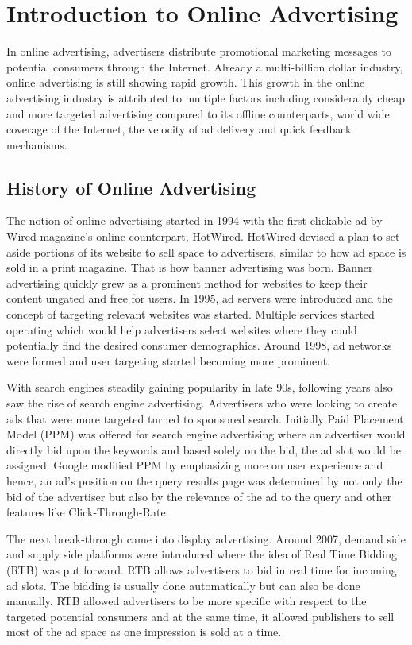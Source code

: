 \section{Introduction to Online Advertising}

In online advertising, advertisers distribute promotional marketing messages to potential consumers through the Internet. Already a multi-billion dollar industry, online advertising is still showing rapid growth. This growth in the online advertising industry is attributed to multiple factors including considerably cheap and more targeted advertising compared to its offline counterparts, world wide coverage of the Internet, the velocity of ad delivery and quick feedback mechanisms.



\subsection{History of Online Advertising}
The notion of online advertising started in 1994 with the first clickable ad by Wired magazine's online counterpart, HotWired. HotWired devised a plan to set aside portions of its website to sell space to advertisers, similar to how ad space is sold in a print magazine. That is how banner advertising was born. Banner advertising quickly grew as a prominent method for websites to keep their content ungated and free for users. In 1995, ad servers were introduced and the concept of targeting relevant websites was started. Multiple services started operating which would help advertisers select websites where they could potentially find the desired consumer demographics. Around 1998, ad networks were formed and user targeting started becoming more prominent.

With search engines steadily gaining popularity in late 90s, following years also saw the rise of search engine advertising. Advertisers who were looking to create ads that were more targeted turned to sponsored search. Initially Paid Placement Model (PPM) was offered for search engine advertising where an advertiser would directly bid upon the keywords and based solely on the bid, the ad slot would be assigned. Google modified PPM by emphasizing more on user experience and hence, an ad's position on the query results page was determined by not only the bid of the advertiser but also by the relevance of the ad to the query and other features like Click-Through-Rate. 


The next break-through came into display advertising. Around 2007, demand side and supply side platforms were introduced where the idea of Real Time Bidding (RTB) was put forward. RTB allows advertisers to bid in real time for incoming ad slots. The bidding is usually done automatically but can also be done manually. RTB allowed advertisers to be more specific with respect to the targeted potential consumers and at the same time, it allowed publishers to sell most of the ad space as one impression is sold at a time.

